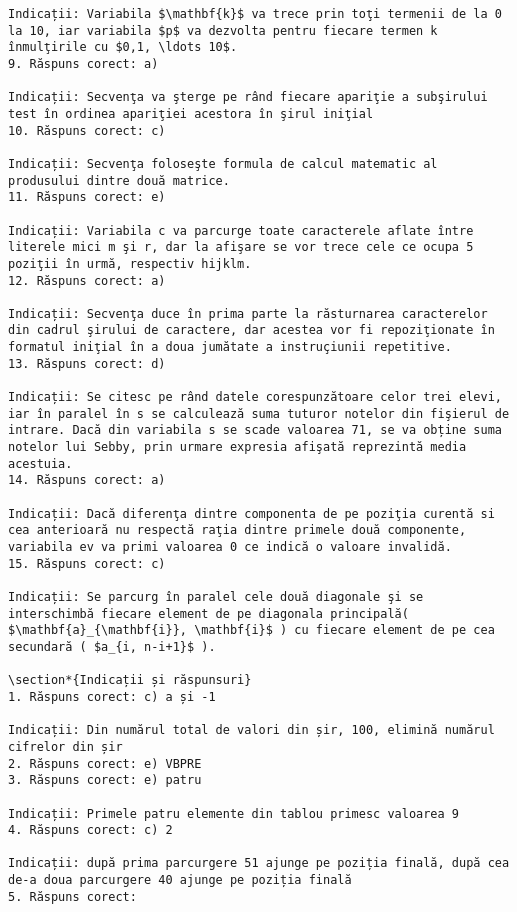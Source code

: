 \begin{verbatim}
Indicații: Variabila $\mathbf{k}$ va trece prin toţi termenii de la 0 la 10, iar variabila $p$ va dezvolta pentru fiecare termen k înmulţirile cu $0,1, \ldots 10$.
9. Răspuns corect: a)

Indicații: Secvenţa va şterge pe rând fiecare apariţie a subşirului test în ordinea apariţiei acestora în şirul iniţial
10. Răspuns corect: c)

Indicații: Secvenţa foloseşte formula de calcul matematic al produsului dintre două matrice.
11. Răspuns corect: e)

Indicații: Variabila c va parcurge toate caracterele aflate între literele mici m şi r, dar la afişare se vor trece cele ce ocupa 5 poziţii în urmă, respectiv hijklm.
12. Răspuns corect: a)

Indicații: Secvenţa duce în prima parte la răsturnarea caracterelor din cadrul şirului de caractere, dar acestea vor fi repoziţionate în formatul iniţial în a doua jumătate a instruçiunii repetitive.
13. Răspuns corect: d)

Indicații: Se citesc pe rând datele corespunzătoare celor trei elevi, iar în paralel în s se calculează suma tuturor notelor din fişierul de intrare. Dacă din variabila s se scade valoarea 71, se va obține suma notelor lui Sebby, prin urmare expresia afişată reprezintă media acestuia.
14. Răspuns corect: a)

Indicații: Dacă diferenţa dintre componenta de pe poziţia curentă si cea anterioară nu respectă raţia dintre primele două componente, variabila ev va primi valoarea 0 ce indică o valoare invalidă.
15. Răspuns corect: c)

Indicații: Se parcurg în paralel cele două diagonale şi se interschimbă fiecare element de pe diagonala principală( $\mathbf{a}_{\mathbf{i}}, \mathbf{i}$ ) cu fiecare element de pe cea secundară ( $a_{i, n-i+1}$ ).

\section*{Indicații și răspunsuri}
1. Răspuns corect: c) a și -1

Indicații: Din numărul total de valori din șir, 100, elimină numărul cifrelor din șir
2. Răspuns corect: e) VBPRE
3. Răspuns corect: e) patru

Indicații: Primele patru elemente din tablou primesc valoarea 9
4. Răspuns corect: c) 2

Indicații: după prima parcurgere 51 ajunge pe poziția finală, după cea de-a doua parcurgere 40 ajunge pe poziția finală
5. Răspuns corect:


\end{verbatim}
